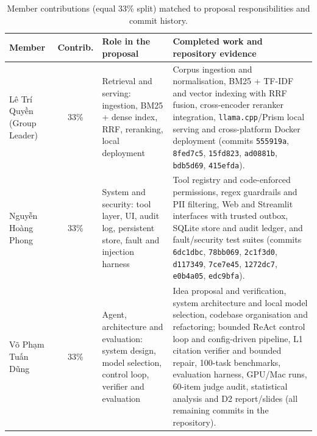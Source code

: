 \begin{table}[H]\tabstyle
\footnotesize\renewcommand{\arraystretch}{1.08}
\begin{tabularx}{\textwidth}{@{}L{2.8cm}cL{3.2cm}Y@{}}
\toprule Member & Contrib. & Role in the proposal & Completed work and repository evidence\\\midrule
Lê Trí Quyền (Group Leader) & 33\% & Retrieval and serving: ingestion, BM25 + dense index, RRF, reranking, local deployment & Corpus ingestion and normalisation, BM25 + TF-IDF and vector indexing with RRF fusion, cross-encoder reranker integration, \texttt{llama.cpp}/Prism local serving and cross-platform Docker deployment (commits \texttt{555919a}, \texttt{8fed7c5}, \texttt{15fd823}, \texttt{ad0881b}, \texttt{bdb5d69}, \texttt{415efda}).\\
Nguyễn Hoàng Phong & 33\% & System and security: tool layer, UI, audit log, persistent store, fault and injection harness & Tool registry and code-enforced permissions, regex guardrails and PII filtering, Web and Streamlit interfaces with trusted outbox, SQLite store and audit ledger, and fault/security test suites (commits \texttt{6dc1dbc}, \texttt{78bb069}, \texttt{2c1f3d0}, \texttt{d117349}, \texttt{7ce7e45}, \texttt{1272dc7}, \texttt{e0b4a05}, \texttt{edc9bfa}).\\
Võ Phạm Tuấn Dũng & 33\% & Agent, architecture and evaluation: system design, model selection, control loop, verifier and evaluation & Idea proposal and verification, system architecture and local model selection, codebase organisation and refactoring; bounded ReAct control loop and config-driven pipeline, L1 citation verifier and bounded repair, 100-task benchmarks, evaluation harness, GPU/Mac runs, 60-item judge audit, statistical analysis and D2 report/slides (all remaining commits in the repository).\\
\bottomrule\end{tabularx}
\caption{Member contributions (equal 33\% split) matched to proposal responsibilities and commit history.}\label{tab:contrib}
\end{table}
